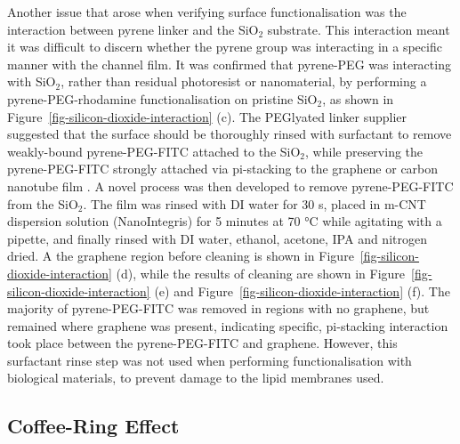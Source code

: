 \documentclass[
  a4paper,
]{scrbook}
\begin{document}
Another issue that arose when verifying surface functionalisation was
the interaction between pyrene linker and the SiO\(_2\) substrate. This
interaction meant it was difficult to discern whether the pyrene group
was interacting in a specific manner with the channel film. It was
confirmed that pyrene-PEG was interacting with SiO\(_2\), rather than
residual photoresist or nanomaterial, by performing a
pyrene-PEG-rhodamine functionalisation on pristine SiO\(_2\), as shown
in Figure~\ref{fig-silicon-dioxide-interaction} (c). The PEGlyated
linker supplier suggested that the surface should be thoroughly rinsed
with surfactant to remove weakly-bound pyrene-PEG-FITC attached to the
SiO\(_2\), while preserving the pyrene-PEG-FITC strongly attached via
pi-stacking to the graphene or carbon nanotube film
\autocite{CreativePEGworks2022}. A novel process was then developed to
remove pyrene-PEG-FITC from the SiO\(_2\). The film was rinsed with DI
water for 30 s, placed in m-CNT dispersion solution (NanoIntegris) for 5
minutes at 70 °C while agitating with a pipette, and finally rinsed with
DI water, ethanol, acetone, IPA and nitrogen dried. A the graphene
region before cleaning is shown in
Figure~\ref{fig-silicon-dioxide-interaction} (d), while the results of
cleaning are shown in Figure~\ref{fig-silicon-dioxide-interaction} (e)
and Figure~\ref{fig-silicon-dioxide-interaction} (f). The majority of
pyrene-PEG-FITC was removed in regions with no graphene, but remained
where graphene was present, indicating specific, pi-stacking interaction
took place between the pyrene-PEG-FITC and graphene. However, this
surfactant rinse step was not used when performing functionalisation
with biological materials, to prevent damage to the lipid membranes
used.

\hypertarget{sec-coffee-ring}{%
\subsection{Coffee-Ring Effect}\label{sec-coffee-ring}}
\end{document}
